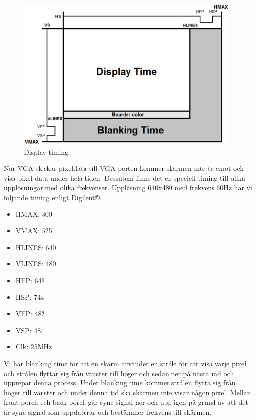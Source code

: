\documentclass[11pt]{article}
\begin{document}
\begin{figure}[h]
    \begin{center}
        \includegraphics[width=11cm]{display_timing.eps}
        \caption{Display timing}
        \label{fig:display_timing}
    \end{center}
\end{figure}

När VGA skickar pixeldata till VGA porten kommer skärmen inte ta emot och visa pixel data under hela tiden. Dessutom finns det en speciell timing till olika upplösningar med olika frekvenser. Upplösning 640x480 med frekvens 60Hz har vi följande timing enligt Digilent®.

\begin{itemize}
    \item HMAX: 800
    \item VMAX: 525
    \item HLINES: 640
    \item VLINES: 480
    \item HFP: 648
    \item HSP: 744
    \item VFP: 482
    \item VSP: 484
    \item Clk: 25MHz
\end{itemize}

Vi har blanking time för att en skärm använder en stråle för att visa varje pixel och strålen flyttar sig från vänster till höger och sedan ner på nästa rad och upprepar denna process. Under blanking time kommer strålen flytta sig från höger till vänster och under denna tid ska skärmen inte visar någon pixel. Mellan front porch och back porch går sync signal ner och upp igen på grund av att det är sync signal som uppdaterar och bestämmer frekvens till skärmen.
\end{document}
